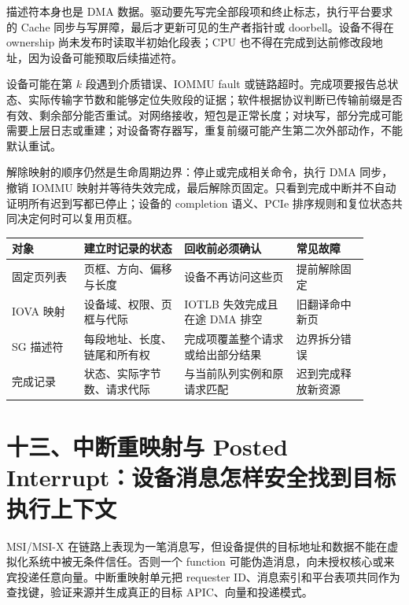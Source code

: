 描述符本身也是 DMA 数据。驱动要先写完全部段项和终止标志，执行平台要求的 Cache 同步与写屏障，最后才更新可见的生产者指针或 doorbell。设备不得在 ownership 尚未发布时读取半初始化段表；CPU 也不得在完成到达前修改段地址，因为设备可能预取后续描述符。


设备可能在第 $k$ 段遇到介质错误、IOMMU fault 或链路超时。完成项要报告总状态、实际传输字节数和能够定位失败段的证据；软件根据协议判断已传输前缀是否有效、剩余部分能否重试。对网络接收，短包是正常长度；对块写，部分完成可能需要上层日志或重建；对设备寄存器写，重复前缀可能产生第二次外部动作，不能默认重试。

解除映射的顺序仍然是生命周期边界：停止或完成相关命令，执行 DMA 同步，撤销 IOMMU 映射并等待失效完成，最后解除页固定。只看到完成中断并不自动证明所有迟到写都已停止；设备的 completion 语义、PCIe 排序规则和复位状态共同决定何时可以复用页框。

\begin{longtable}{L{0.18\linewidth}L{0.25\linewidth}L{0.29\linewidth}L{0.18\linewidth}}
\toprule
对象 & 建立时记录的状态 & 回收前必须确认 & 常见故障 \\
\midrule
固定页列表 & 页框、方向、偏移与长度 & 设备不再访问这些页 & 提前解除固定 \\\tablerowrule
IOVA 映射 & 设备域、权限、页框与代际 & IOTLB 失效完成且在途 DMA 排空 & 旧翻译命中新页 \\\tablerowrule
SG 描述符 & 每段地址、长度、链尾和所有权 & 完成项覆盖整个请求或给出部分结果 & 边界拆分错误 \\\tablerowrule
完成记录 & 状态、实际字节数、请求代际 & 与当前队列实例和原请求匹配 & 迟到完成释放新资源 \\
\bottomrule
\end{longtable}

\section{十三、中断重映射与 Posted Interrupt：设备消息怎样安全找到目标执行上下文}

MSI/MSI-X 在链路上表现为一笔消息写，但设备提供的目标地址和数据不能在虚拟化系统中被无条件信任。否则一个 function 可能伪造消息，向未授权核心或来宾投递任意向量。中断重映射单元把 requester ID、消息索引和平台表项共同作为查找键，验证来源并生成真正的目标 APIC、向量和投递模式。

